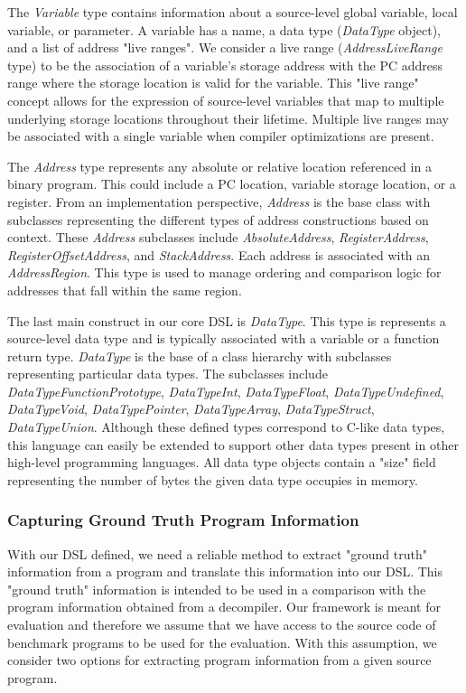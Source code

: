\documentclass[conference]{IEEEtran}
\begin{document}
The \emph{Variable} type contains information about a source-level global variable, local variable, or parameter. A variable has a name, a data type (\emph{DataType} object), and a list of address "live ranges". We consider a live range (\emph{AddressLiveRange} type) to be the association of a variable's storage address with the PC address range where the storage location is valid for the variable. This "live range" concept allows for the expression of source-level variables that map to multiple underlying storage locations throughout their lifetime. Multiple live ranges may be associated with a single variable when compiler optimizations are present.

The \emph{Address} type represents any absolute or relative location referenced in a binary program. This could include a PC location, variable storage location, or a register. From an implementation perspective, \emph{Address} is the base class with subclasses representing the different types of address constructions based on context. These \emph{Address} subclasses include \emph{AbsoluteAddress}, \emph{RegisterAddress}, \emph{RegisterOffsetAddress}, and \emph{StackAddress}. Each address is associated with an \emph{AddressRegion}. This type is used to manage ordering and comparison logic for addresses that fall within the same region.

The last main construct in our core DSL is \emph{DataType}. This type is represents a source-level data type and is typically associated with a variable or a function return type. \emph{DataType} is the base of a class hierarchy with subclasses representing particular data types. The subclasses include \emph{DataTypeFunctionPrototype}, \emph{DataTypeInt}, \emph{DataTypeFloat}, \emph{DataTypeUndefined}, \emph{DataTypeVoid}, \emph{DataTypePointer}, \emph{DataTypeArray}, \emph{DataTypeStruct}, \emph{DataTypeUnion}. Although these defined types correspond to C-like data types, this language can easily be extended to support other data types present in other high-level programming languages. All data type objects contain a "size" field representing the number of bytes the given data type occupies in memory.

\subsubsection{Capturing Ground Truth Program Information}

With our DSL defined, we need a reliable method to extract "ground truth" information from a program and translate this information into our DSL. This "ground truth" information is intended to be used in a comparison with the program information obtained from a decompiler. Our framework is meant for evaluation and therefore we assume that we have access to the source code of benchmark programs to be used for the evaluation. With this assumption, we consider two options for extracting program information from a given source program.
\end{document}
